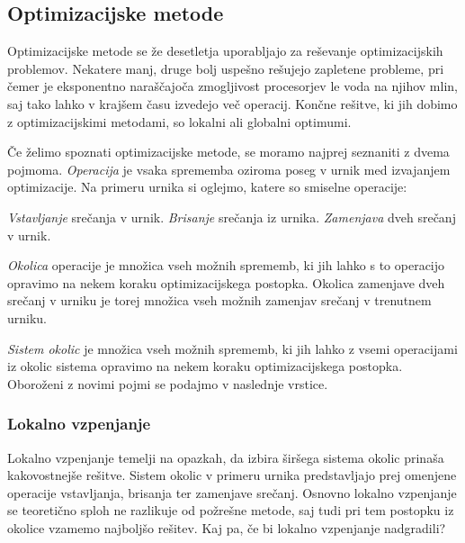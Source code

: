 \documentclass[a4paper,10pt]{article}
\begin{document}
\subsection{Optimizacijske metode}

Optimizacijske metode se že desetletja uporabljajo za reševanje optimizacijskih problemov.
Nekatere manj, druge bolj uspešno rešujejo zapletene probleme, pri čemer je eksponentno
naraščajoča zmogljivost procesorjev le voda na njihov mlin, saj tako lahko v krajšem
času izvedejo več operacij. Končne rešitve, ki jih dobimo z optimizacijskimi metodami,
so lokalni ali globalni optimumi.

Če želimo spoznati optimizacijske metode, se moramo najprej seznaniti z dvema pojmoma.
\emph{Operacija} je vsaka sprememba oziroma poseg v urnik med izvajanjem optimizacije.
Na primeru urnika si oglejmo, katere so smiselne operacije:

   \emph{Vstavljanje} srečanja v urnik.
   \emph{Brisanje} srečanja iz urnika.
   \emph{Zamenjava} dveh srečanj v urnik.

\emph{Okolica} operacije je množica vseh možnih sprememb, ki jih lahko s to operacijo
opravimo na nekem koraku optimizacijskega postopka. Okolica zamenjave dveh srečanj v urniku
je torej množica vseh možnih zamenjav srečanj v trenutnem urniku.

\emph{Sistem okolic} je množica vseh možnih sprememb, ki jih lahko z vsemi operacijami iz
okolic sistema opravimo na nekem koraku optimizacijskega postopka. Oboroženi z novimi pojmi
se podajmo v naslednje vrstice.

\subsubsection{Lokalno vzpenjanje}

Lokalno vzpenjanje temelji na opazkah, da izbira širšega sistema okolic prinaša kakovostnejše
rešitve. Sistem okolic v primeru urnika predstavljajo prej omenjene operacije vstavljanja,
brisanja ter zamenjave srečanj. Osnovno lokalno vzpenjanje se teoretično sploh ne razlikuje
od požrešne metode, saj tudi pri tem postopku iz okolice vzamemo najboljšo rešitev. Kaj pa,
če bi lokalno vzpenjanje nadgradili?
\end{document}
